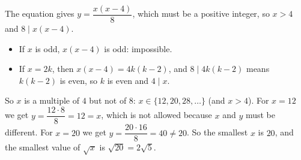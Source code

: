 The equation gives $y=\dfrac{x(x-4)}{8}$, which must be a positive integer, so $x>4$ and $8\mid x(x-4)$.
\begin{itemize}
\item If $x$ is odd, $x(x-4)$ is odd: impossible.
\item If $x=2k$, then $x(x-4)=4k(k-2)$, and $8\mid4k(k-2)$ means $k(k-2)$ is even, so $k$ is even and $4\mid x$.
\end{itemize}
So $x$ is a multiple of $4$ but not of $8$: $x\in\{12,20,28,\ldots\}$ (and $x>4$). For $x=12$ we get $y=\dfrac{12\cdot8}{8}=12=x$, which is not allowed because $x$ and $y$ must be different. For $x=20$ we get $y=\dfrac{20\cdot16}{8}=40\ne20$. So the smallest $x$ is $20$, and the smallest value of $\sqrt x$ is $\sqrt{20}=\boxed{2\sqrt5}$.
